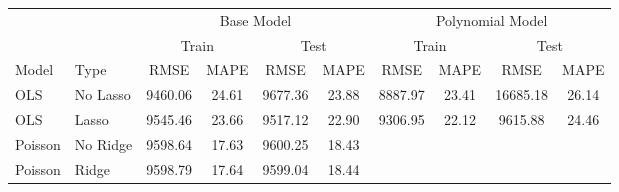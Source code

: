 \begin{tabular}{llcccccccc}
\toprule
 & & \multicolumn{4}{c}{Base Model} & \multicolumn{4}{c}{Polynomial Model} \\
\cmidrule(lr){3-6} \cmidrule(lr){7-10}
 & & \multicolumn{2}{c}{Train} & \multicolumn{2}{c}{Test} & \multicolumn{2}{c}{Train} & \multicolumn{2}{c}{Test} \\
\cmidrule(lr){3-4} \cmidrule(lr){5-6} \cmidrule(lr){7-8} \cmidrule(lr){9-10}

Model & Type & RMSE & MAPE & RMSE & MAPE & RMSE & MAPE & RMSE & MAPE \\
\midrule
OLS & No Lasso & 9460.06 & 24.61 & 9677.36 & 23.88 & 8887.97 & 23.41 & 16685.18 & 26.14 \\
OLS & Lasso & 9545.46 & 23.66 & 9517.12 & 22.90 & 9306.95 & 22.12 & 9615.88 & 24.46 \\
Poisson & No Ridge & 9598.64 & 17.63 & 9600.25 & 18.43 &   &   &   &   \\
Poisson & Ridge & 9598.79 & 17.64 & 9599.04 & 18.44 &   &   &   &   \\
\bottomrule
\end{tabular}
